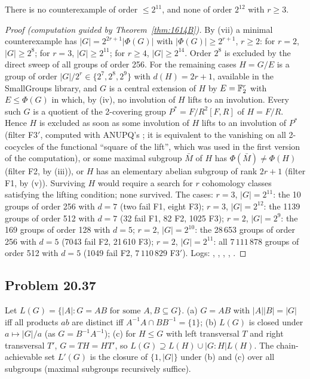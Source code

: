 \begin{theorem}\label{thm:1614C}
There is no counterexample of order $\le 2^{11}$, and none of order $2^{12}$ with $r\ge 3$.
\end{theorem}
\begin{proof}[Proof (computation guided by Theorem~\ref{thm:1614B})]
By (vii) a minimal counterexample has $|G|=2^{2r+1}|\Phi(G)|$ with $|\Phi(G)|\ge 2^{r+1}$, $r\ge 2$: for $r=2$,
$|G|\ge 2^8$; for $r=3$, $|G|\ge 2^{11}$; for $r\ge 4$, $|G|\ge 2^{14}$. Order $2^8$ is excluded by the direct sweep of
all groups of order 256. For the remaining cases $H=G/E$ is a group of order $|G|/2^r\in\{2^7,2^8,2^9\}$ with
$d(H)=2r+1$, available in the SmallGroups library, and $G$ is a central extension of $H$ by $E=\mathbb{F}_2^r$ with
$E\le\Phi(G)$ in which, by (iv), no involution of $H$ lifts to an involution. Every such $G$ is a quotient of the
2-covering group $P^*=F/R^2[F,R]$ of $H=F/R$. Hence $H$ is excluded as soon as some involution of $H$ lifts to an
involution of $P^*$ (filter F3$'$, computed with ANUPQ's ; it is equivalent to the vanishing on all
2-cocycles of the functional ``square of the lift'', which was used in the first version of the computation), or
some maximal subgroup $\bar M$ of $H$ has $\Phi(\bar M)\ne\Phi(H)$ (filter F2, by (iii)), or $H$ has an elementary
abelian subgroup of rank $2r+1$ (filter F1, by (v)). Surviving $H$ would require a search for $r$ cohomology classes
satisfying the lifting condition; none survived. The cases: $r=3$, $|G|=2^{11}$: the 10 groups of order 256 with
$d=7$ (two fail F1, eight F3); $r=3$, $|G|=2^{12}$: the 1139 groups of order 512 with $d=7$ (32 fail F1, 82 F2,
1025 F3); $r=2$, $|G|=2^9$: the 169 groups of order 128 with $d=5$; $r=2$, $|G|=2^{10}$: the 28\,653 groups of order 256
with $d=5$ (7043 fail F2, 21\,610 F3); $r=2$, $|G|=2^{11}$: all $7\,111\,878$ groups of order 512 with $d=5$ (1049 fail
F2, $7\,110\,829$ F3$'$). Logs: , , , ,
.
\end{proof}

\subsection{Problem 20.37}\label{app:2037}
Let $L(G)=\{|A|:G=AB\text{ for some }A,B\subseteq G\}$. (a) $G=AB$ with $|A||B|=|G|$ iff all products $ab$ are
distinct iff $A^{-1}A\cap BB^{-1}=\{1\}$; (b) $L(G)$ is closed under $a\mapsto|G|/a$ (as $G=B^{-1}A^{-1}$); (c) for
$H\le G$ with left transversal $T$ and right transversal $T'$, $G=TH=HT'$, so $L(G)\supseteq L(H)\cup|G:H|L(H)$. The
chain-achievable set $L'(G)$ is the closure of $\{1,|G|\}$ under (b) and (c) over all subgroups (maximal subgroups
recursively suffice).

